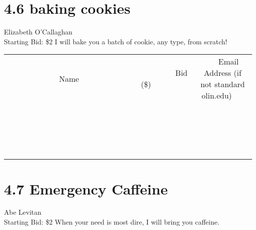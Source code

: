 \documentclass[11pt]{article}
\begin{document}
\section*{4.6 baking cookies}
Elizabeth O'Callaghan
\\
Starting Bid: \$2
\newline
I will bake you a batch of cookie, any type, from scratch!
\\[3ex]
\begin{tabular}{c c c}
~~~~~~~~~~~~~Name~~~~~~~~~~~~~ & ~~~~~~~~~Bid (\$)~~~~~~~~~  & ~~~Email Address (if not standard olin.edu)~~~\\
 & & \\
\hline
 & & \\
\hline
 & & \\
\hline
 & & \\
\hline
 & & \\
\hline
 & & \\
\hline
 & & \\
\hline
 & & \\
\hline
 & & \\
\hline
 & & \\
\hline
 & & \\
\hline
 & & \\
\hline
 & & \\
\hline
 & & \\
\hline
 & & \\
\hline
 & & \\
\hline
 & & \\
\hline
 & & \\
\hline
 & & \\
\hline
\end{tabular}
\newpage
\section*{4.7 Emergency Caffeine}
Abe Levitan
\\
Starting Bid: \$2
\newline
When your need is most dire, I will bring you caffeine.
\end{document}
